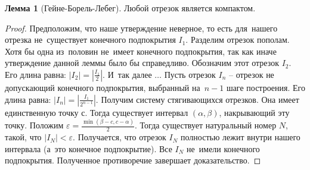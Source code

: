 \documentclass[pdftex, 12pt, a4paper]{article}
\def \a{\alpha}
\def \b{\beta}
\newcommand{\e}{\varepsilon}
\theoremstyle{definition} %
\newtheorem{lemma}[myth]{Лемма}
\numberwithin{problem}{section}
\numberwithin{blits}{section}
\begin{document}
\begin{lemma}[Гейне-Борель-Лебег] Любой отрезок является компактом.
\end{lemma}
\begin{proof}
Предположим, что наше утверждение неверное, то есть для~нашего отрезка не~существует конечного подпокрытия $I_1$. Разделим отрезок пополам. Хотя бы одна из~половин не~имеет конечного подпокрытия, так как иначе утверждение данной леммы было бы справедливо. Обозначим этот отрезок $I_2$. Его длина равна: $|I_2|=|\frac{I_1}{2}|$. И~так далее $\ldots$ Пусть отрезок $I_n$ – отрезок не допускающий конечного подпокрытия, выбранный на~$n-1$ шаге построения. Его длина равна: $|I_n|=|\frac{I_1}{2^{n-1}}|$. Получим систему стягивающихся отрезков. Она имеет единственную точку $с$. Тогда существует интервал $(\a,\b)$, накрывающий эту точку. Положим $\e = \frac{\min(\b-c,c-\a)}{2}$. Тогда существует натуральный номер $N$, такой, что $|I_N| < \e$. Получается, что отрезок $I_N$ полностью лежит внутри нашего интервала (а~это конечное подпокрытие). Все $I_N$ не~имели конечного подпокрытия. Полученное противоречие завершает доказательство.


\end{proof}
\end{document}

